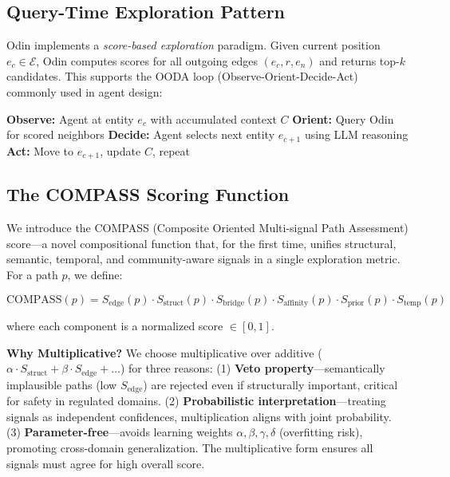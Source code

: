 \documentclass[10pt,twocolumn]{article}
\begin{document}
\subsection{Query-Time Exploration Pattern}

Odin implements a \textit{score-based exploration} paradigm. Given current position $e_c \in \mathcal{E}$, Odin computes scores for all outgoing edges $(e_c, r, e_n)$ and returns top-$k$ candidates. This supports the OODA loop (Observe-Orient-Decide-Act)~\cite{boyd1996essence} commonly used in agent design:

\begin{algorithmic}[1]
\STATE \textbf{Observe:} Agent at entity $e_c$ with accumulated context $C$
\STATE \textbf{Orient:} Query Odin for scored neighbors
\STATE \textbf{Decide:} Agent selects next entity $e_{c+1}$ using LLM reasoning
\STATE \textbf{Act:} Move to $e_{c+1}$, update $C$, repeat
\end{algorithmic}

\subsection{The COMPASS Scoring Function}

We introduce the COMPASS (Composite Oriented Multi-signal Path Assessment) score—a novel compositional function that, for the first time, unifies structural, semantic, temporal, and community-aware signals in a single exploration metric. For a path $p$, we define:

\begin{equation}
\text{COMPASS}(p) = S_{\text{edge}}(p) \cdot S_{\text{struct}}(p) \cdot S_{\text{bridge}}(p) \cdot S_{\text{affinity}}(p) \cdot S_{\text{prior}}(p) \cdot S_{\text{temp}}(p)
\end{equation}

where each component is a normalized score $\in [0,1]$.

\textbf{Why Multiplicative?} We choose multiplicative over additive ($\alpha \cdot S_{\text{struct}} + \beta \cdot S_{\text{edge}} + \ldots$) for three reasons: (1) \textbf{Veto property}---semantically implausible paths (low $S_{\text{edge}}$) are rejected even if structurally important, critical for safety in regulated domains. (2) \textbf{Probabilistic interpretation}---treating signals as independent confidences, multiplication aligns with joint probability. (3) \textbf{Parameter-free}---avoids learning weights $\alpha, \beta, \gamma, \delta$ (overfitting risk), promoting cross-domain generalization. The multiplicative form ensures all signals must agree for high overall score.
\end{document}
